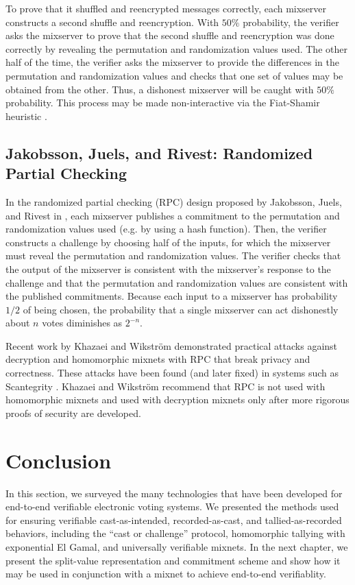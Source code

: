 To prove that it shuffled and reencrypted messages correctly, each mixserver constructs a second shuffle and reencryption. With $50\%$ probability, the verifier asks the mixserver to prove that the second shuffle and reencryption was done correctly by revealing the permutation and randomization values used. The other half of the time, the verifier asks the mixserver to provide the differences in the permutation and randomization values and checks that one set of values may be obtained from the other. Thus, a dishonest mixserver will be caught with $50\%$ probability. This process may be made non-interactive via the Fiat-Shamir heuristic \cite{fiat-shamir}.

\subsection{Jakobsson, Juels, and Rivest: Randomized Partial Checking}

In the randomized partial checking (RPC) design proposed by Jakobsson, Juels, and Rivest in \cite{jjr02}, each mixserver publishes a commitment to the permutation and randomization values used (e.g. by using a hash function). Then, the verifier constructs a challenge by choosing half of the inputs, for which the mixserver must reveal the permutation and randomization values. The verifier checks that the output of the mixserver is consistent with the mixserver's response to the challenge and that the permutation and randomization values are consistent with the published commitments. Because each input to a mixserver has probability $1/2$ of being chosen, the probability that a single mixserver can act dishonestly about $n$ votes diminishes as $2^{-n}$.

Recent work by Khazaei and Wikstr\"{o}m \cite{khazaei13} demonstrated practical attacks against decryption and homomorphic mixnets with RPC that break privacy and correctness. These attacks have been found (and later fixed) in systems such as Scantegrity \cite{scantegrity}. Khazaei and Wikstr\"{o}m recommend that RPC is not used with homomorphic mixnets and used with decryption mixnets only after more rigorous proofs of security are developed.

\section{Conclusion} \label{evote:conclusion}

In this section, we surveyed the many technologies that have been developed for end-to-end verifiable electronic voting systems. We presented the methods used for ensuring verifiable cast-as-intended, recorded-as-cast, and tallied-as-recorded behaviors, including the ``cast or challenge'' protocol, homomorphic tallying with exponential El Gamal, and universally verifiable mixnets. In the next chapter, we present the split-value representation and commitment scheme and show how it may be used in conjunction with a mixnet to achieve end-to-end verifiablity.






